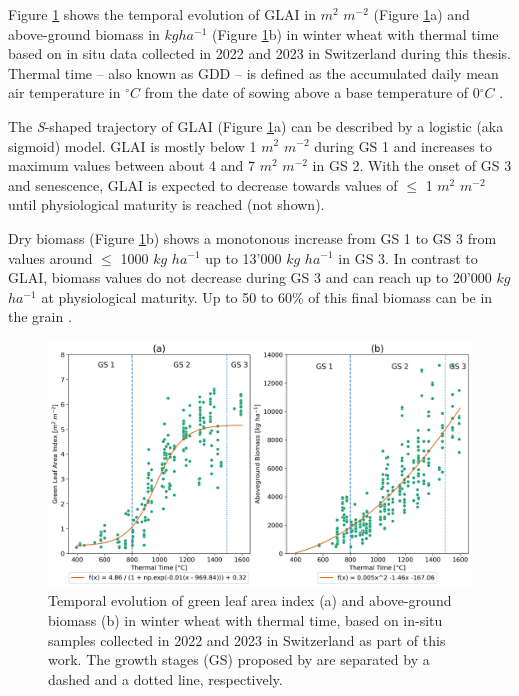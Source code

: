 Figure \ref{fig:ww-growth-development} shows the temporal evolution of \gls{GLAI} in $m^2$ $m^{-2}$ (Figure \ref{fig:ww-growth-development}a) and above-ground biomass in $kg ha^{-1}$ (Figure \ref{fig:ww-growth-development}b) in winter wheat with thermal time based on in situ data collected in 2022 and 2023 in Switzerland during this thesis. Thermal time -- also known as \gls{GDD} -- is defined as the accumulated daily mean air temperature in $^{\circ} C$ from the date of sowing above a base temperature of 0$^{\circ} C$ \citep{mcmaster_growing_1997}.

The \textsl{S}-shaped trajectory of \gls{GLAI} (Figure \ref{fig:ww-growth-development}a) can be described by a logistic (aka sigmoid) model. \gls{GLAI} is mostly below 1 $m^2$ $m^{-2}$ during \gls{GS} 1 and increases to maximum values between about 4 and 7 $m^2$ $m^{-2}$ in \gls{GS} 2. With the onset of \gls{GS} 3 and senescence, \gls{GLAI} is expected to decrease towards values of $\le$ 1 $m^2$ $m^{-2}$ until physiological maturity is reached (not shown).

Dry biomass (Figure \ref{fig:ww-growth-development}b) shows a monotonous increase from \gls{GS} 1 to \gls{GS} 3 from values around $\le$ 1000 $kg$ $ha^{-1}$ up to 13'000 $kg$ $ha^{-1}$ in \gls{GS} 3. In contrast to \gls{GLAI}, biomass values do not decrease during \gls{GS} 3 and can reach up to 20'000 $kg$ $ha^{-1}$ at physiological maturity. Up to 50 to 60\% of this final biomass can be in the grain \citep{long_meeting_2015}.

\begin{figure}[H]
    \centering
    \includegraphics[width=\textwidth]{01-Introduction/img/glai_and_biomass_growth-stages.png}
    \caption{Temporal evolution of green leaf area index (a) and above-ground biomass (b) in winter wheat with thermal time, based on in-situ samples collected in 2022 and 2023 in Switzerland as part of this work. The growth stages (GS) proposed by \cite{kirby_analysis_1988} are separated by a dashed and a dotted line, respectively.}
    \label{fig:ww-growth-development}
\end{figure}

